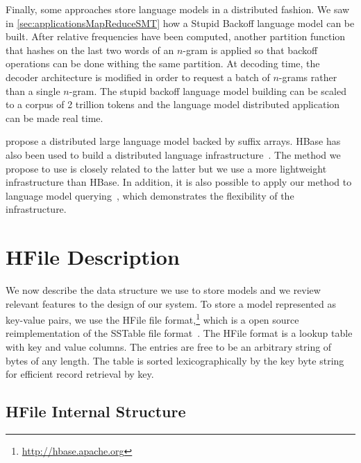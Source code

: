 
Finally, some approaches store language models in a distributed fashion.
We saw in \autoref{sec:applicationsMapReduceSMT} how a Stupid Backoff language
model can be built. After relative frequencies have been computed, another
partition function that hashes on the last two words of an $n$-gram is applied
so that backoff operations can be done withing the same partition.
At decoding time, the decoder architecture is modified in order
to request a batch of $n$-grams rather than a single $n$-gram.
The stupid backoff language model building can be scaled
to a corpus of 2 trillion tokens and the language model distributed
application can be made real time.

\citet{zhang-hildebrand-vogel:2006:EMNLP} propose a distributed large language
model backed by suffix arrays. HBase has also been used to build a distributed
language infrastructure~\citep{yu:2008:mastersthesis}. The method we propose to
use is closely related to the latter but we use a more lightweight
infrastructure than HBase. In addition, it is also possible to apply our method
to language model querying~\citep{pino-waite-byrne:2012:PBML}, which
demonstrates the flexibility of the infrastructure.

\section{HFile Description}
\label{sec:hfile}

We now describe the data structure we use to store models and we review relevant
features to the design of our system. To store a model represented as key-value
pairs, we use the HFile file format,\footnote{\url{http://hbase.apache.org}} which is
a open source reimplementation of the SSTable file
format~\citep{chang-dean-ghemawat-hsieh-wallach-burrows-chandra-fikes-gruber:2008:ACM}.
The HFile format is a lookup table with key and value columns. The entries are free
to be an arbitrary string of bytes of any length. The table is sorted
lexicographically by the key byte string for efficient record retrieval by key.

\subsection{HFile Internal Structure}

